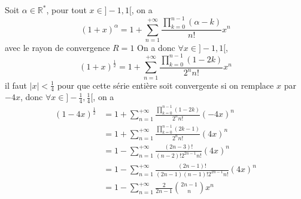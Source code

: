\documentclass[a4paper,12pt]{book}
\begin{document}
\renewcommand{\labelitemi}{$\blacktriangleright$}
\renewcommand{\labelitemii}{$\bullet$}


\section{}
Soit $\alpha \in \mathbb{R}^*$, pour tout $x\in ]-1,1[$, on a 
$$
(1+x)^\alpha=1+\sum_{n=1}^{+\infty}\frac{\prod_{k=0}^{n-1}(\alpha-k)}{n!}x^n
$$
avec le rayon de convergence $R=1$
On a donc $\forall x \in ]-1,1[ $, 
$$
(1+x)^{\frac{1}{2}}=1+\sum_{n=1}^{+\infty}\frac{\prod_{k=0}^{n-1}(1-2k)}{2^n n!}x^n
$$
il faut $|x|<\frac{1}{4}$ pour que cette série entière soit convergente si on remplace $x$ par $-4x$, 
donc $\forall x \in ]-\frac{1}{4},\frac{1}{4}[$, on a 
\begin{align*}
(1-4x)^{\frac{1}{2}}&=1+\sum_{n=1}^{+\infty}\frac{\prod_{k=0}^{n-1}(1-2k)}{2^n n!}(-4x)^n\\
&=1+\sum_{n=1}^{+\infty}\frac{\prod_{k=0}^{n-1}(2k-1)}{2^n n!}(4x)^n\\
&=1-\sum_{n=1}^{+\infty}\frac{(2n-3)!}{(n-2)!2^{2n-1}n!}(4x)^n\\
&=1-\sum_{n=1}^{+\infty}\frac{(2n-1)!}{(2n-1)(n-1)!2^{2n-1}n!}(4x)^n\\
&=1-\sum_{n=1}^{+\infty}\frac{2}{2n-1}\binom{2n-1}{n}x^n 
\end{align*}


 
\end{document}
